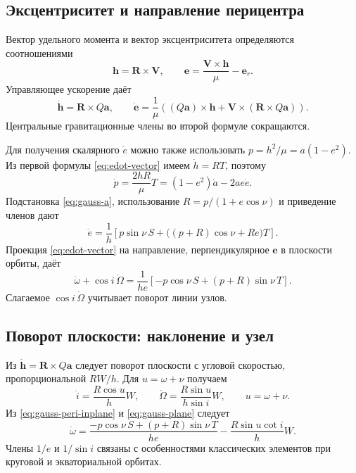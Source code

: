 \documentclass[a4paper,11pt]{article}
\numberwithin{equation}{section}
\theoremstyle{remark}
\newcommand{\vect}[1]{\boldsymbol{#1}}
\begin{document}
\subsection{Эксцентриситет и направление перицентра}

Вектор удельного момента и вектор эксцентриситета определяются
соотношениями
\begin{equation}
 \vect h=\vect R\times\vect V,\qquad
 \vect e=\frac{\vect V\times\vect h}{\mu}-\vect e_r.
 \label{eq:invariants}
\end{equation}
Управляющее ускорение даёт
\begin{equation}
 \dot{\vect h}=\vect R\times Q\vect a,
 \qquad
 \dot{\vect e}=\frac{1}{\mu}
 \left((Q\vect a)\times\vect h+
              \vect V\times(\vect R\times Q\vect a)\right).
 \label{eq:edot-vector}
\end{equation}
Центральные гравитационные члены во второй формуле сокращаются.

Для получения скалярного $\dot e$ можно также использовать
$p=h^2/\mu=a(1-e^2)$. Из первой формулы
\eqref{eq:edot-vector} имеем $\dot h=RT$, поэтому
\[
 \dot p=\frac{2hR}{\mu}T
       =(1-e^2)\dot a-2ae\dot e.
\]
Подстановка \eqref{eq:gauss-a}, использование
$R=p/(1+e\cos\nu)$ и приведение членов дают
\begin{equation}
 \dot e=\frac1h\left[
       p\sin\nu\,S+
       \bigl((p+R)\cos\nu+Re\bigr)T\right].
 \label{eq:gauss-e}
\end{equation}
Проекция \eqref{eq:edot-vector} на направление, перпендикулярное
$\vect e$ в плоскости орбиты, даёт
\begin{equation}
 \dot\omega+\cos i\,\dot\Omega
 =\frac{1}{he}\left[-p\cos\nu\,S+(p+R)\sin\nu\,T\right].
 \label{eq:gauss-peri-inplane}
\end{equation}
Слагаемое $\cos i\,\dot\Omega$ учитывает поворот линии узлов.

\subsection{Поворот плоскости: наклонение и узел}

Из $\dot{\vect h}=\vect R\times Q\vect a$
следует поворот плоскости с угловой скоростью, пропорциональной
$RW/h$. Для $u=\omega+\nu$ получаем
\begin{equation}
 \dot i=\frac{R\cos u}{h}W,
 \qquad
 \dot\Omega=\frac{R\sin u}{h\sin i}W,
 \qquad u=\omega+\nu.
 \label{eq:gauss-plane}
\end{equation}
Из \eqref{eq:gauss-peri-inplane} и \eqref{eq:gauss-plane}
следует
\begin{equation}
 \dot\omega=\frac{-p\cos\nu\,S+(p+R)\sin\nu\,T}{he}
                  -\frac{R\sin u\cot i}{h}W.
 \label{eq:gauss-omega}
\end{equation}
Члены $1/e$ и $1/\sin i$ связаны с особенностями классических
элементов при круговой и экваториальной орбитах.
\end{document}
